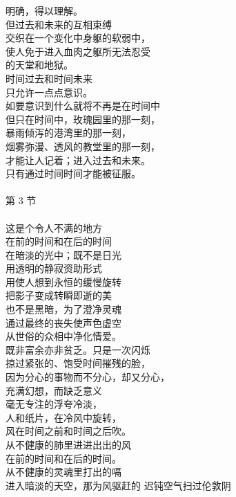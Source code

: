\documentclass{article}
\begin{document}
明确，得以理解。 \\
但过去和未来的互相束缚 \\
交织在一个变化中身躯的软弱中， \\
使人免于进入血肉之躯所无法忍受 \\
的天堂和地狱。 \\
时间过去和时间未来 \\
只允许一点点意识。 \\
如要意识到什么就将不再是在时间中 \\
但只在时间中，玫瑰园里的那一刻， \\
暴雨倾泻的港湾里的那一刻， \\
烟雾弥漫、透风的教堂里的那一刻， \\
才能让人记着；进入过去和未来。 \\
只有通过时间时间才能被征服。 \\
 \\
第 3 节 \\
 \\
这是个令人不满的地方 \\
在前的时间和在后的时间 \\
在暗淡的光中；既不是日光 \\
用透明的静寂资助形式 \\
用使人想到永恒的缓慢旋转 \\
把影子变成转瞬即逝的美 \\
也不是黑暗，为了澄净灵魂 \\
通过最终的丧失使声色虚空 \\
从世俗的众相中净化情爱。 \\
既非富余亦非贫乏。只是一次闪烁 \\
掠过紧张的、饱受时间摧残的脸， \\
因为分心的事物而不分心，却又分心， \\
充满幻想，而缺乏意义 \\
毫无专注的浮夸冷淡， \\
人和纸片，在冷风中旋转， \\
风在时间之前和时间之后吹。 \\
从不健康的肺里进进出出的风 \\
在前的时间和在后的时间。 \\
从不健康的灵魂里打出的嗝 \\
进入暗淡的天空，那为风驱赶的
迟钝空气扫过伦敦阴

\newpage 
\end{document}
